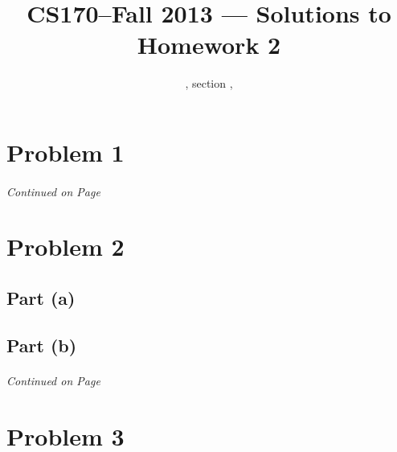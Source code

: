 \documentclass[11pt]{article}
\title{CS170--Fall 2013 --- Solutions to Homework 2}
\author{\Name, section \Sec, \texttt{\Login}}
\begin{document}
\maketitle

\section*{Problem 1}
\label{pg:end-of-p1}




%
\paragraph{} \emph{Continued on Page \pageref{pg:p1-continuation}}
\newpage


\pagestyle{plain}
\section*{Problem 2}
\subsection*{Part (a)}

\subsection*{Part (b)}
\label{pg:end-of-p2}


%
\paragraph{} \emph{Continued on Page \pageref{pg:p2-continuation}}



\newpage

\section*{Problem 3}
\end{document}
